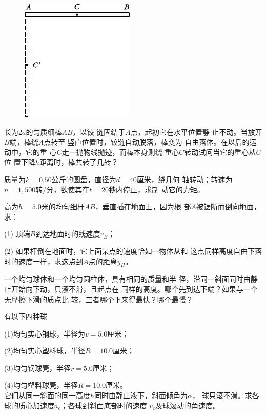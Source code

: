 \begin{exercises}
\begin{figure}
    \vspace{-1em}
    \centering
    \includegraphics{figure/fig10.32}
    \caption{}
    \label{fig:10.32}
\end{figure}
\exercise 长为$ 2a $的匀质细棒$ AB $，以铰
链固结于$ A $点，起初它在水平位置静
止不动。当放开$ B $端，棒绕$ A $点转至
竖直位置时，铰链自动脱落，棒变为
自由落体。在以后的运动中，它的重
心$ C $走一抛物线抛迹，而棒本身则绕
重心$ C $转动试问当它的重心从$ C $位
置下降$ h $距离时，棒共转了几转？

\exercise 质量为$  k = 0 . 5 0$公斤的圆盘，直径为$  d = 4 0   $厘米，绕几何
轴转动；转速为$ n = 1,500 $转/分，欲使其在$  t = 2 0   $秒内停止，求制
动它的力矩。

\exercise 高为$  h = 5 . 0   $米的均匀细杆$ AB $，垂直插在地面上，因为根
部$ A $被锯断而倒向地面，求：

(1) 顶端$ B $到达地面时的线速度$ v_B $；

(2) 如果杆倒在地面时，它上面某点的速度恰如一物体从和
这点同样高度自由下落时的速度一样，求这点到$ A $点的距离$ y_H $。

\exercise 一个均匀球体和一个均匀圆柱体，具有相同的质量和半
径，沿同一斜面同时由静止开始向下动，只滚不滑，且起点在
同样的高度。哪个先到达下端？如果与一个无摩擦下滑的质点比
较，三者哪个下来得最快？哪个最慢？

\exercise 有以下四种球

(1)均匀实心钢球，半径为$  v = 5 .  0 $厘米；

(2)均匀实心塑料球，半径$  R = 1 0 . 0   $厘米；

(3)均匀钢球壳，半径$  r = 5 . 0   $厘米；

(4)均匀塑料球壳，半径$  R = 1 0 . 0   $厘米。\\
它们从同一斜面的同一高度$ h $同时由静止液下，斜面倾角为$ \alpha $，
球只滚不滑。求各球的质心加速度$  a _ { c }  $；各球到斜面底部时的速度
$ v _ { c }   $及球滚动的角速度。


\end{exercises}
